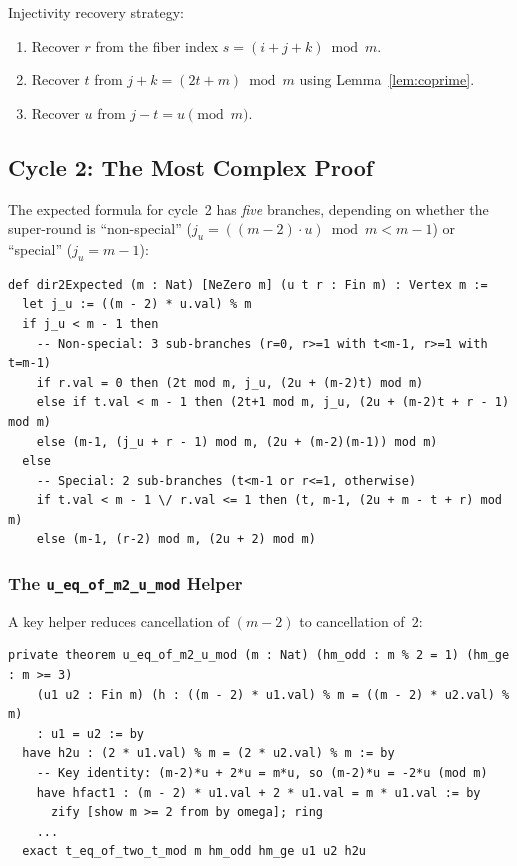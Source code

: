 \documentclass[11pt,a4paper]{article}
\begin{document}
Injectivity recovery strategy:
\begin{enumerate}
  \item Recover $r$ from the fiber index $s = (i + j + k) \bmod m$.
  \item Recover $t$ from $j + k = (2t + m) \bmod m$ using Lemma~\ref{lem:coprime}.
  \item Recover $u$ from $j - t = u \pmod{m}$.
\end{enumerate}

\subsection{Cycle 2: The Most Complex Proof}

The expected formula for cycle~2 has \emph{five} branches, depending on whether the
super-round is ``non-special'' ($j_u = ((m{-}2) \cdot u) \bmod m < m{-}1$)
or ``special'' ($j_u = m{-}1$):

\begin{lstlisting}[caption={Cycle 2 expected formula (simplified)}]
def dir2Expected (m : Nat) [NeZero m] (u t r : Fin m) : Vertex m :=
  let j_u := ((m - 2) * u.val) % m
  if j_u < m - 1 then
    -- Non-special: 3 sub-branches (r=0, r>=1 with t<m-1, r>=1 with t=m-1)
    if r.val = 0 then (2t mod m, j_u, (2u + (m-2)t) mod m)
    else if t.val < m - 1 then (2t+1 mod m, j_u, (2u + (m-2)t + r - 1) mod m)
    else (m-1, (j_u + r - 1) mod m, (2u + (m-2)(m-1)) mod m)
  else
    -- Special: 2 sub-branches (t<m-1 or r<=1, otherwise)
    if t.val < m - 1 \/ r.val <= 1 then (t, m-1, (2u + m - t + r) mod m)
    else (m-1, (r-2) mod m, (2u + 2) mod m)
\end{lstlisting}

\subsubsection{The \texttt{u\_eq\_of\_m2\_u\_mod} Helper}

A key helper reduces cancellation of $(m{-}2)$ to cancellation of~$2$:

\begin{lstlisting}[caption={Reducing $(m{-}2)$-cancellation to $2$-cancellation}]
private theorem u_eq_of_m2_u_mod (m : Nat) (hm_odd : m % 2 = 1) (hm_ge : m >= 3)
    (u1 u2 : Fin m) (h : ((m - 2) * u1.val) % m = ((m - 2) * u2.val) % m)
    : u1 = u2 := by
  have h2u : (2 * u1.val) % m = (2 * u2.val) % m := by
    -- Key identity: (m-2)*u + 2*u = m*u, so (m-2)*u = -2*u (mod m)
    have hfact1 : (m - 2) * u1.val + 2 * u1.val = m * u1.val := by
      zify [show m >= 2 from by omega]; ring
    ...
  exact t_eq_of_two_t_mod m hm_odd hm_ge u1 u2 h2u
\end{lstlisting}
\end{document}
